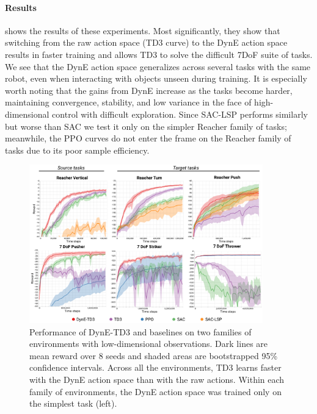 \paragraph{Results}
 shows the results of these experiments.
Most significantly, they show that switching from the raw action space (TD3 curve) to the DynE action space results in faster training and allows TD3 to solve the difficult 7DoF suite of tasks.
We see that the DynE action space generalizes across several tasks with the same robot, even when interacting with objects unseen during training.
It is especially worth noting that the gains from DynE increase as the tasks become harder, maintaining convergence, stability, and low variance in the face of high-dimensional control with difficult exploration.
Since SAC-LSP \citep{haarnoja2018latent} performs similarly but worse than SAC we test it only on the simpler Reacher family of tasks; meanwhile, the PPO curves do not enter the frame on the Reacher family of tasks due to its poor sample efficiency.

\begin{figure}[t]
\centering
\includegraphics[width=0.9\textwidth]{figures/dyne/states_results_lsp_smalltitle.pdf}
\caption{Performance of DynE-TD3 and baselines on two families of environments with low-dimensional observations.
Dark lines are mean reward over 8 seeds and shaded areas are bootstrapped 95\% confidence intervals.
Across all the environments, TD3 learns faster with the DynE action space than with the raw actions.
Within each family of environments, the DynE action space was trained only on the simplest task (left).}
\label{fig:lowd_results}
\end{figure}

